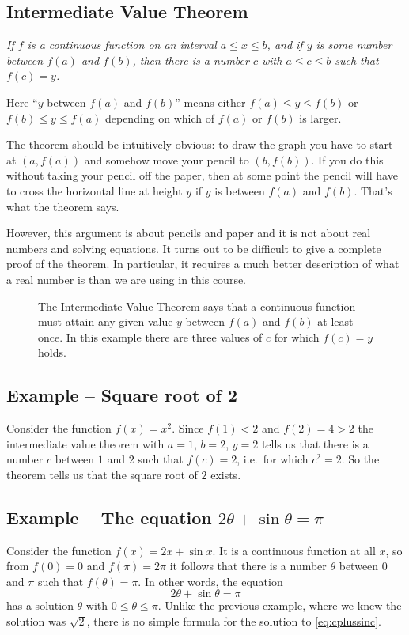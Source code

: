 \subsection{Intermediate Value Theorem}
\itshape
If $f$ is a continuous function on an interval $a\leq x\leq b$, and if $y$ is
some number between $f(a)$ and $f(b)$, then there is a number $c$ with $a\leq
c\leq b$ such that $f(c) = y$.  \upshape\medskip

Here ``$y$ between $f(a)$ and $f(b)$'' means either $f(a)\leq y\leq f(b)$ or $f(b)\leq y\leq f(a)$ depending on which of $f(a)$ or $f(b)$ is larger.

The theorem should be intuitively obvious: to draw the graph you have
to start at $(a, f(a))$ and somehow move your pencil to $(b, f(b))$.
If you do this without taking your pencil off the paper, then at some
point the pencil will have to cross the horizontal line at height $y$
if $y$ is between $f(a)$ and $f(b)$.  That's what the theorem says.

However, this argument is about pencils and paper and it is not about
real numbers and solving equations.  It turns out to be difficult to
give a complete proof of the theorem.  In particular, it requires a
much better description of what a real number is than we are using in
this course.

\begin{figure}\label{fig:05intermediatevalue}
  \centering 
  \caption{The Intermediate Value Theorem says that a continuous function must
    attain any given value $y$ between $f(a)$ and $f(b)$ at least once.  In this
    example there are three values of $c$ for which $f(c) = y$ holds.}
\end{figure}

\subsection{Example -- Square root of 2}
Consider the function $f(x) = x^2$. 
Since $f(1)<2$ and $f(2) = 4>2$ the intermediate value theorem with $a=1$,
$b=2$, $y=2$ tells us that there is a number $c$ between $1$ and $2$ such that
$f(c)=2$, i.e.\ for which $c^2=2$.  So the theorem tells us that the square root
of $2$ exists.

\subsection{Example -- The equation $2\theta+\sin\theta=\pi$}
Consider the function $f(x) = 2x+\sin x$.  It is a continuous function
at all $x$, so from $f(0) = 0$ and $f(\pi) = 2\pi$ it follows that
there is a number $\theta$ between $0$ and $\pi$ such that $f(\theta)
= \pi$.  In other words, the equation
\begin{equation}\label{eq:cplussinc}
  2\theta+\sin \theta =\pi
\end{equation}
has a solution $\theta$ with $0\leq \theta\leq \pi$.  Unlike the
previous example, where we knew the solution was $\sqrt2$, there is no
simple formula for the solution to \eqref{eq:cplussinc}.

